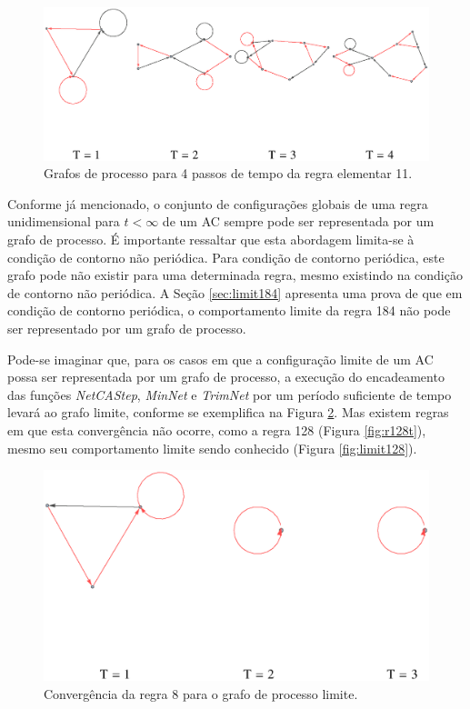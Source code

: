 \documentclass[12pt,a4paper]{article}
\begin{document}
\begin{figure}[htp]
\begin{center}
\includegraphics[scale=0.8]{img/Rule11.eps}
\caption{Grafos de processo para 4 passos de tempo da regra elementar 11.}
\label{fig:r11t}
\end{center}
\end{figure}

Conforme já mencionado, o conjunto de configurações globais de uma regra
unidimensional para $t < \infty$ de um AC sempre pode ser representada por um
grafo de processo. É importante ressaltar que esta abordagem limita-se à condição
de contorno não periódica. Para condição de contorno periódica, este grafo
pode não existir para uma determinada regra, mesmo existindo na condição de
contorno não periódica. A Seção \ref{sec:limit184} apresenta uma prova de que em
condição de contorno periódica, o comportamento limite da regra 184 não
pode ser representado por um grafo de processo.

Pode-se imaginar que, para os casos em que a configuração limite de um AC
possa ser representada por um grafo de processo, a execução do encadeamento
das funções \emph{NetCAStep}, \emph{MinNet} e \emph{TrimNet} por um
período suficiente de tempo levará ao grafo limite, conforme se exemplifica
na Figura \ref{fig:r8t}. Mas existem regras em que esta convergência não
ocorre, como a regra 128 (Figura \ref{fig:r128t}), mesmo seu comportamento limite
sendo conhecido  (Figura \ref{fig:limit128}).

\begin{figure}[htp]
\begin{center}
\includegraphics[scale=0.8]{img/Rule8.eps}
\caption{Convergência da regra 8 para o grafo de processo limite.}
\label{fig:r8t}
\end{center}
\end{figure}
\end{document}
